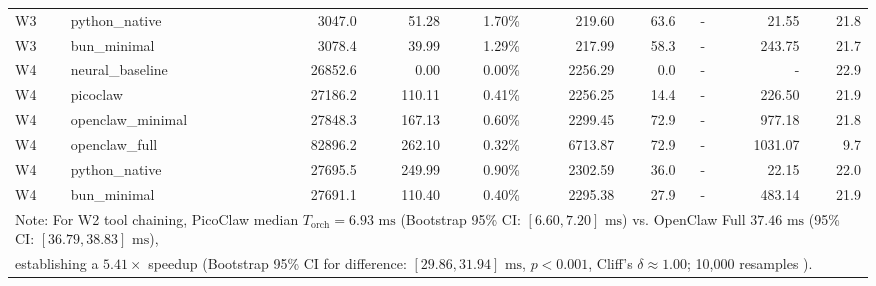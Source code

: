 \begin{table}[t]
\begin{tabular}{llrrrrrrrr}
W3 & python\_native & 3047.0 & 51.28 & 1.70\% & 219.60 & 63.6 & - & 21.55 & 21.8 \\
W3 & bun\_minimal & 3078.4 & 39.99 & 1.29\% & 217.99 & 58.3 & - & 243.75 & 21.7 \\
\midrule
W4 & neural\_baseline & 26852.6 & 0.00 & 0.00\% & 2256.29 & 0.0 & - & - & 22.9 \\
W4 & picoclaw & 27186.2 & 110.11 & 0.41\% & 2256.25 & 14.4 & - & 226.50 & 21.9 \\
W4 & openclaw\_minimal & 27848.3 & 167.13 & 0.60\% & 2299.45 & 72.9 & - & 977.18 & 21.8 \\
W4 & openclaw\_full & 82896.2 & 262.10 & 0.32\% & 6713.87 & 72.9 & - & 1031.07 & 9.7 \\
W4 & python\_native & 27695.5 & 249.99 & 0.90\% & 2302.59 & 36.0 & - & 22.15 & 22.0 \\
W4 & bun\_minimal & 27691.1 & 110.40 & 0.40\% & 2295.38 & 27.9 & - & 483.14 & 21.9 \\
\midrule
\multicolumn{10}{l}{\footnotesize Note: For W2 tool chaining, PicoClaw median $T_{\text{orch}} = 6.93\text{ ms}$ (Bootstrap 95\% CI: $[6.60, 7.20]\text{ ms}$) vs. OpenClaw Full $37.46\text{ ms}$ (95\% CI: $[36.79, 38.83]\text{ ms}$),} \\
\multicolumn{10}{l}{\footnotesize establishing a $5.41\times$ speedup (Bootstrap 95\% CI for difference: $[29.86, 31.94]\text{ ms}$, $p < 0.001$, Cliff's $\delta \approx 1.00$; 10,000 resamples \cite{efron1979}).} \\
\bottomrule
\end{tabular}
\end{table}
